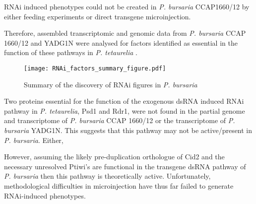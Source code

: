 RNAi induced phenotypes could not be created in \textit{P. bursaria} CCAP1660/12
by either feeding experiments or direct transgene microinjection. 

Therefore, assembled transcriptomic and genomic data from \textit{P. bursaria}
CCAP 1660/12 and YADG1N were analysed for factors identified as essential in the function
of these pathways in \textit{P. tetaurelia} \citep{Marker2014}. 

\begin{figure}
    \texttt{[image: RNAi\_factors\_summary\_figure.pdf]}
    \caption[Summary of RNAi Factors Presence]{Summary of the discovery
    of RNAi figures in \textit{P. bursaria}}
    \label{fig:rnai_summary}
\end{figure}

Two proteins essential for the function of the exogenous dsRNA induced
RNAi pathway in \textit{P. tetaurelia}, Psd1 and Rdr1, were not found in the partial genome and transcriptome 
of \textit{P. bursaria} CCAP 1660/12 or the transcriptome of \textit{P. bursaria} YADG1N.
This suggests that this pathway may not be active/present in \textit{P. bursaria}.
Either, 


However, assuming the likely pre-duplication orthologue of Cid2 and the necessary 
unresolved Ptiwi's are functional
in the transgene dsRNA pathway of \textit{P. bursaria}
then this pathway is theoretically active.  Unfortunately, methodological
difficulties in microinjection have thus far failed to generate RNAi-induced
phenotypes.
